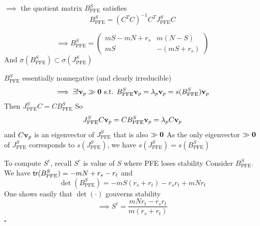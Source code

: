 \documentclass[aspectratio=169]{beamer}
\begin{document}
\begin{frame}
	$\implies$ the quotient matrix $B_{\textrm{PFE}}^S$ satisfies
\[
B_{\textrm{PFE}}^S = (C^TC)^{-1}C^TJ_{\textrm{PFE}}^SC
\label{eq:formulaJPPB}
\]

\[
\implies B_{\textrm{PFE}}^S = \begin{pmatrix}
mS - mN +r_s & m(N-S) \\
mS & -(mS + r_s)
\end{pmatrix}
\]
\vfill
And $\sigma(B_{\textrm{PFE}}^S) \subset \sigma(J_{\textrm{PFE}}^S)$
\end{frame}

\begin{frame}
	$B_{\textrm{PFE}}^S$ essentially nonnegative (and clearly irreducible)
	\[
	\implies\exists! \bv_p\gg \b0 
	\textrm{ s.t. }  B_{\textrm{PFE}}^S\bv_p = \lambda_p \bv_p=s(B_{\textrm{PFE}}^S)\bv_p
	\]
	\vfill 
	Then $J_{\textrm{PFE}}^SC=CB_{\textrm{PFE}}^S$
	\vfill
	So
	\begin{equation*}
		J_{\textrm{PFE}}^SC\mathbf{v}_p = CB_{\textrm{PFE}}^S\mathbf{v}_p = \lambda_p C \mathbf{v}_p
	\end{equation*}
	and $C\mathbf{v}_p$ is an eigenvector of $J_{\textrm{PFE}}^S$ that is also $\gg\b0$
	\vfill
	As the only eigenvector $\gg\b0$ of $J_{\textrm{PFE}}^S$ corresponds to $s(J_{\textrm{PFE}}^S)$, we have $s(J_{\textrm{PFE}}^S) = s(B_{\textrm{PFE}}^S)$ 
\end{frame}

\begin{frame}	
	To compute $S^c$, recall $S^c$ is value of $S$ where PFE loses stability
	\vfill
	Consider $B_{\textrm{PFE}}^S$. We have $\mathsf{tr}(B_{\textrm{PFE}}^S) = -mN +r_s-r_t$ and
	\[
		\det(B_{\textrm{PFE}}^S) = -mS(r_s+r_t) - r_sr_t  + mNr_t
	\]
	\vfill
	One shows easily that $\det(\cdot)$ gouverns stability
	\vfill
	\[
		\implies S^c = \frac{mNr_t-r_sr_t}{m(r_s+r_t)}
	\]
	\flushright$\square$
\end{frame}




\end{document}
